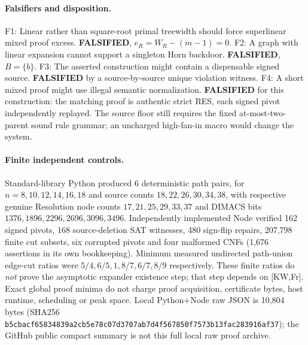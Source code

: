 \documentclass[11pt]{article}
\begin{document}
\paragraph{Falsifiers and disposition.}
\noindent F1: Linear rather than square-root primal treewidth should force superlinear mixed proof excess. \textbf{FALSIFIED}, $e_R=W_R-(m-1)=0$.
\noindent F2: A graph with linear expansion cannot support a singleton Horn backdoor. \textbf{FALSIFIED}, $B=\{b\}$.
\noindent F3: The asserted construction might contain a dispensable signed source. \textbf{FALSIFIED} by a source-by-source unique violation witness.
\noindent F4: A short mixed proof might use illegal semantic normalization. \textbf{FALSIFIED} for this construction: the matching proof is authentic strict RES, each signed pivot independently replayed. The source floor still requires the fixed at-most-two-parent sound rule grammar; an uncharged high-fan-in macro would change the system.

\paragraph{Finite independent controls.}
Standard-library Python produced 6 deterministic path pairs, for $n=8,10,12,14,16,18$ and source counts $18,22,26,30,34,38$, with respective genuine Resolution node counts $17,21,25,29,33,37$ and DIMACS bits $1376,1896,2296,2696,3096,3496$. Independently implemented Node verified 162 signed pivots, 168 source-deletion SAT witnesses, 480 sign-flip repairs, 207,798 finite cut subsets, six corrupted pivots and four malformed CNFs (1,676 assertions in its own bookkeeping). Minimum measured undirected path-union edge-cut ratios were $5/4,6/5,1,8/7,6/7,8/9$ respectively. These finite ratios do \emph{not} prove the asymptotic expander existence step; that step depends on [KW,Fr]. Exact global proof minima do not charge proof acquisition, certificate bytes, host runtime, scheduling or peak space. Local Python+Node raw JSON is 10,804 bytes (SHA256 \texttt{b5cbacf65834839a2cb5e78c07d3707ab7d4f567850f7573b13fac283916af37}); the GitHub public compact summary is not this full local raw proof archive.
\end{document}
